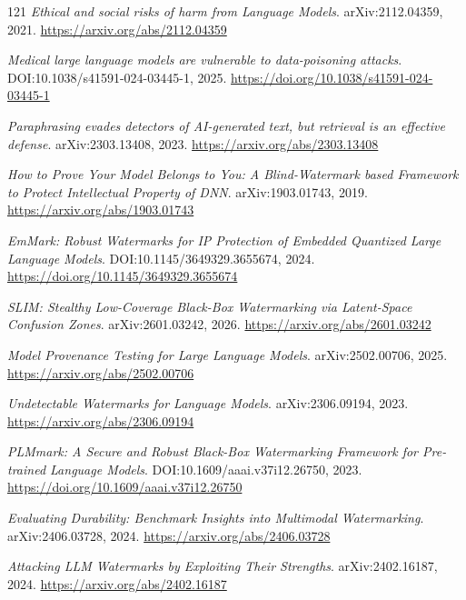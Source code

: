 \documentclass[11pt,a4paper]{article}
\begin{document}
\begin{thebibliography}{121}
\newblock \emph{Ethical and social risks of harm from Language Models}.
\newblock arXiv:2112.04359, 2021.
\newblock \url{https://arxiv.org/abs/2112.04359}

\newblock \emph{Medical large language models are vulnerable to data-poisoning attacks}.
\newblock DOI:10.1038/s41591-024-03445-1, 2025.
\newblock \url{https://doi.org/10.1038/s41591-024-03445-1}

\newblock \emph{Paraphrasing evades detectors of AI-generated text, but retrieval is an effective defense}.
\newblock arXiv:2303.13408, 2023.
\newblock \url{https://arxiv.org/abs/2303.13408}

\newblock \emph{How to Prove Your Model Belongs to You: A Blind-Watermark based Framework to Protect Intellectual Property of DNN}.
\newblock arXiv:1903.01743, 2019.
\newblock \url{https://arxiv.org/abs/1903.01743}

\newblock \emph{EmMark: Robust Watermarks for IP Protection of Embedded Quantized Large Language Models}.
\newblock DOI:10.1145/3649329.3655674, 2024.
\newblock \url{https://doi.org/10.1145/3649329.3655674}

\newblock \emph{SLIM: Stealthy Low-Coverage Black-Box Watermarking via Latent-Space Confusion Zones}.
\newblock arXiv:2601.03242, 2026.
\newblock \url{https://arxiv.org/abs/2601.03242}

\newblock \emph{Model Provenance Testing for Large Language Models}.
\newblock arXiv:2502.00706, 2025.
\newblock \url{https://arxiv.org/abs/2502.00706}

\newblock \emph{Undetectable Watermarks for Language Models}.
\newblock arXiv:2306.09194, 2023.
\newblock \url{https://arxiv.org/abs/2306.09194}

\newblock \emph{PLMmark: A Secure and Robust Black-Box Watermarking Framework for Pre-trained Language Models}.
\newblock DOI:10.1609/aaai.v37i12.26750, 2023.
\newblock \url{https://doi.org/10.1609/aaai.v37i12.26750}

\newblock \emph{Evaluating Durability: Benchmark Insights into Multimodal Watermarking}.
\newblock arXiv:2406.03728, 2024.
\newblock \url{https://arxiv.org/abs/2406.03728}

\newblock \emph{Attacking LLM Watermarks by Exploiting Their Strengths}.
\newblock arXiv:2402.16187, 2024.
\newblock \url{https://arxiv.org/abs/2402.16187}


\end{thebibliography}
\end{document}
